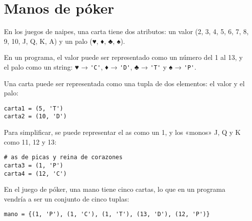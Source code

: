 \section{Manos de póker}

En los juegos de naipes, una carta tiene dos atributos: un valor (2, 3,
4, 5, 6, 7, 8, 9, 10, J, Q, K, A) y un palo (♥, ♦, ♣, ♠).

En un programa, el valor puede ser representado como un número del 1 al
13, y el palo como un string: ♥ → \lstinline!'C'!, ♦ → \lstinline!'D'!,
♣ → \lstinline!'T'! y ♠ → \lstinline!'P'!.

Una carta puede ser representada como una tupla de dos elementos: el
valor y el palo:

\begin{lstlisting}
carta1 = (5, 'T')
carta2 = (10, 'D')
\end{lstlisting}

Para simplificar, se puede representar el as como un 1, y los «monos» J,
Q y K como 11, 12 y 13:

\begin{lstlisting}
# as de picas y reina de corazones
carta3 = (1, 'P')
carta4 = (12, 'C')
\end{lstlisting}

En el juego de póker, una mano tiene cinco cartas, lo que en un programa
vendría a ser un conjunto de cinco tuplas:

\begin{lstlisting}
mano = {(1, 'P'), (1, 'C'), (1, 'T'), (13, 'D'), (12, 'P')}
\end{lstlisting}

